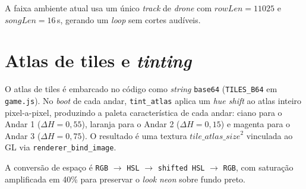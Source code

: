 A faixa ambiente atual usa um único \emph{track} de \emph{drone} com
$rowLen = 11025$ e $songLen = 16$\,s, gerando um \emph{loop} sem cortes audíveis.

\section{Atlas de tiles e \emph{tinting}}

O atlas de tiles é embarcado no código como \emph{string} \texttt{base64}
(\texttt{TILES\_B64} em \texttt{game.js}). No \emph{boot} de cada andar,
\texttt{tint\_atlas} aplica um \emph{hue shift} ao atlas inteiro pixel-a-pixel,
produzindo a paleta característica de cada andar: ciano para o Andar 1
($\Delta H = 0{,}55$), laranja para o Andar 2 ($\Delta H = 0{,}15$) e magenta
para o Andar 3 ($\Delta H = 0{,}75$). O resultado é uma textura
$\mathit{tile\_atlas\_size}^2$ vinculada ao GL via \texttt{renderer\_bind\_image}.

A conversão de espaço é \texttt{RGB} $\rightarrow$ \texttt{HSL} $\rightarrow$
\texttt{shifted HSL} $\rightarrow$ \texttt{RGB}, com saturação amplificada em 40\%
para preservar o \emph{look} \emph{neon} sobre fundo preto.
